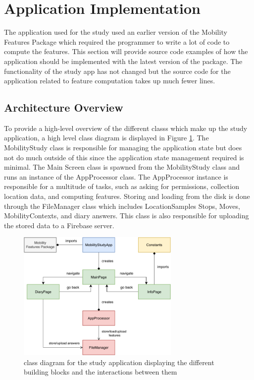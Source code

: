 \section{Application Implementation}
The application used for the study used an earlier version of the Mobility Features Package which required the programmer to write a lot of code to compute the features. This section will provide source code examples of how the application should be implemented with the latest version of the package. The functionality of the study app has not changed but the source code for the application related to feature computation takes up much fewer lines.

\subsection{Architecture Overview}
To provide a high-level overview of the different classs which make up the study application, a high level class diagram is displayed in Figure \ref{fig:app-class-diagram}. The MobilityStudy class is responsible for managing the application state but does not do much outside of this since the application state management required is minimal. The Main Screen class is spawned from the MobilityStudy class and runs an instance of the AppProcessor class. The AppProcessor instance is responsible for a multitude of tasks, such as asking for permissions, collection location data, and computing features. Storing and loading from the disk is done through the FileManager class which includes LocationSamples Stops, Moves, MobilityContexts, and diary answers. This class is also responsible for uploading the stored data to a Firebase server.

\begin{figure}
    \centering
    \includegraphics[width=0.7\textwidth]{images/diagrams/app-diagram.pdf}
    \caption{class diagram for the study application displaying the different building blocks and the interactions between them}
    \label{fig:app-class-diagram}
\end{figure}

